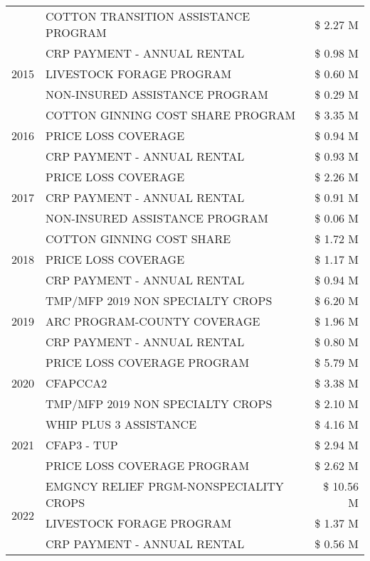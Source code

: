 \begin{tabular}{llr}
 & COTTON TRANSITION ASSISTANCE PROGRAM & \$ 2.27 M \\
\cline{1-3}
\multirow[t]{3}{*}{2015} & CRP PAYMENT - ANNUAL RENTAL & \$ 0.98 M \\
 & LIVESTOCK FORAGE PROGRAM & \$ 0.60 M \\
 & NON-INSURED ASSISTANCE PROGRAM & \$ 0.29 M \\
\cline{1-3}
\multirow[t]{3}{*}{2016} & COTTON GINNING COST SHARE PROGRAM & \$ 3.35 M \\
 & PRICE LOSS COVERAGE & \$ 0.94 M \\
 & CRP PAYMENT - ANNUAL RENTAL & \$ 0.93 M \\
\cline{1-3}
\multirow[t]{3}{*}{2017} & PRICE LOSS COVERAGE & \$ 2.26 M \\
 & CRP PAYMENT - ANNUAL RENTAL & \$ 0.91 M \\
 & NON-INSURED ASSISTANCE PROGRAM & \$ 0.06 M \\
\cline{1-3}
\multirow[t]{3}{*}{2018} & COTTON GINNING COST SHARE & \$ 1.72 M \\
 & PRICE LOSS COVERAGE & \$ 1.17 M \\
 & CRP PAYMENT - ANNUAL RENTAL & \$ 0.94 M \\
\cline{1-3}
\multirow[t]{3}{*}{2019} & TMP/MFP 2019 NON SPECIALTY CROPS & \$ 6.20 M \\
 & ARC PROGRAM-COUNTY COVERAGE & \$ 1.96 M \\
 & CRP PAYMENT - ANNUAL RENTAL & \$ 0.80 M \\
\cline{1-3}
\multirow[t]{3}{*}{2020} & PRICE LOSS COVERAGE PROGRAM & \$ 5.79 M \\
 & CFAPCCA2 & \$ 3.38 M \\
 & TMP/MFP 2019 NON SPECIALTY CROPS & \$ 2.10 M \\
\cline{1-3}
\multirow[t]{3}{*}{2021} & WHIP PLUS 3 ASSISTANCE & \$ 4.16 M \\
 & CFAP3 - TUP & \$ 2.94 M \\
 & PRICE LOSS COVERAGE PROGRAM & \$ 2.62 M \\
\cline{1-3}
\multirow[t]{3}{*}{2022} & EMGNCY RELIEF PRGM-NONSPECIALITY CROPS & \$ 10.56 M \\
 & LIVESTOCK FORAGE PROGRAM & \$ 1.37 M \\
 & CRP PAYMENT - ANNUAL RENTAL & \$ 0.56 M \\
\cline{1-3}
\bottomrule
\end{tabular}
